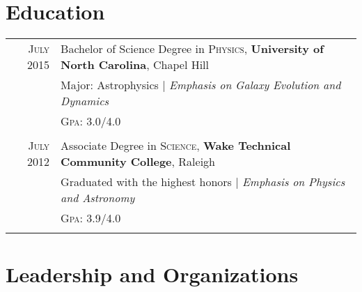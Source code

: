 \documentclass[a4paper,10pt]{article} %
\begin{document}

\section{Education}

\begin{tabular}{rl}	
\textsc{July} 2015 & Bachelor of Science Degree in \textsc{Physics}, \textbf{University of North Carolina}, Chapel Hill\\
& \small Major: Astrophysics | \emph{Emphasis on Galaxy Evolution and Dynamics}\\
&\normalsize \textsc{Gpa}: 3.0/4.0\\%
&\\


\textsc{July} 2012 & Associate Degree in \textsc{Science}, \textbf{Wake Technical Community College}, Raleigh \\
& \small Graduated with the highest honors  | \emph{Emphasis on Physics and Astronomy} \normalsize \\
&\normalsize \textsc{Gpa}: 3.9/4.0\\%
&\\


\end{tabular}



\section{Leadership and Organizations}
\end{document}
